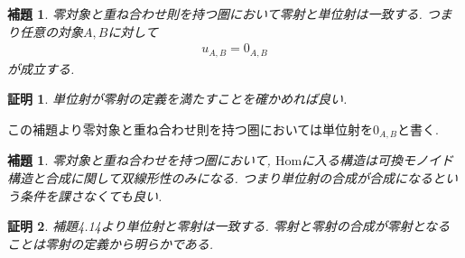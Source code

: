 \documentclass[a4paper,12pt]{ltjsarticle}
\theoremstyle{break}
\newtheorem{lem}[thm]{補題}
\newtheorem*{prf}{証明}
\newcommand{\Hom}{\mathrm{Hom}}
\numberwithin{equation}{section}
\begin{document}
\begin{lem}
  零対象と重ね合わせ則を持つ圏において零射と単位射は一致する. 
  つまり任意の対象$A,B$に対して
  \begin{align*}
    u_{A,B}=0_{A,B}
  \end{align*}
  が成立する. 
\end{lem}

\begin{prf}
  単位射が零射の定義を満たすことを確かめれば良い. 
\end{prf}

この補題より零対象と重ね合わせ則を持つ圏においては単位射を$0_{A,B}$と書く. 

\begin{lem}
  零対象と重ね合わせを持つ圏において, $\Hom$に入る構造は可換モノイド構造と合成に関して双線形性のみになる. 
  つまり単位射の合成が合成になるという条件を課さなくても良い. 
\end{lem}  

\begin{prf}
  補題4.14より単位射と零射は一致する. 
  零射と零射の合成が零射となることは零射の定義から明らかである. 
\end{prf}
\end{document}
